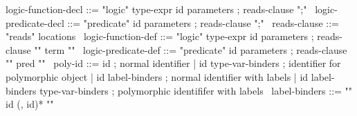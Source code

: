 \begin{syntax}
  logic-function-decl ::= "logic" type-expr id parameters ;
                          reads-clause ";"
  \
  logic-predicate-decl ::= "predicate" id parameters ;
                          reads-clause ";"
  \
  reads-clause ::= "reads" locations
  \
  logic-function-def ::= "logic" type-expr id parameters ;
                   reads-clause "{" term "}"
  \
  logic-predicate-def ::= "predicate" id parameters ; 
                          reads-clause "{" pred "}"
  \
  poly-id ::= id ; normal identifier
  | id type-var-binders ; identifier for polymorphic object 
  | id label-binders ; normal identifier with labels
  | id label-binders type-var-binders ; polymorphic identififer with labels
  \ 
  label-binders ::= "{" id (, id)* "}" 
\end{syntax}